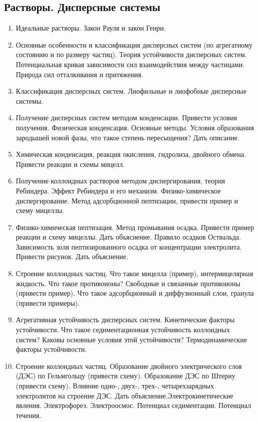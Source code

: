 \subsection{Растворы. Дисперсные системы}
\begin{enumerate}
\item 
Идеальные растворы. Закон Рауля и закон Генри. 
\item
Основные особенности и классификация дисперсных систем (по агрегатному состоянию и по размеру частиц). Теория устойчивости дисперсных систем. Потенциальная кривая зависимости сил взаимодействия между частицами. Природа сил отталкивания и притяжения.
  
\item 
Классификация  дисперсных систем. Лиофильные и лиофобные дисперсные системы. 

\item
Получение дисперсных систем методом конденсации. Привести условия получения. Физическая конденсация. Основные методы. Условия образования зародышей новой фазы, что такое степень пересыщения? Дать описание.

\item
Химическая конденсация, реакция окисления, гидролиза, двойного обмена. Привести реакции и схемы мицелл.

\item
Получение коллоидных растворов методом диспергирования, теория Ребиндера. Эффект Ребиндера и его механизм. Физико-химическое диспергирование. Метод адсорбционной пептизации, привести пример и схему мицеллы.

\item
Физико-химическая пептизация. Метод промывания осадка. Привести пример реакции и схему мицеллы. Дать объяснение. Правило осадков Оствальда. Зависимость золя пептизированного осадка от концентрации электролита. Привести рисунок. Дать объяснение.

\item
Строение коллоидных частиц. Что такое мицелла (пример), интермицелярная жидкость. Что такое противоионы? Свободные и связанные противоионы (привести пример). Что такое адсорбционный и диффузионный слои, гранула (привести примеры). 

\item
Агрегативная устойчивость дисперсных систем. Кинетические факторы устойчивости. Что такое седиментационная устойчивость коллоидных систем? Каковы основные условия этой устойчивости? Термодинамические факторы устойчивости.

\item 
Строение коллоидных частиц. Образование двойного электрического слоя (ДЭС) по Гельмгольцу (привести схему). Образование ДЭС по Штерну (привести схему). Влияние одно-, двух-, трех-, четырехзарядных электролитов на строение ДЭС. Дать объяснение.Электрокинетические явления. Электрофорез. Электроосмос. Потенциал седиментации. Потенциал течения.


\end{enumerate}
